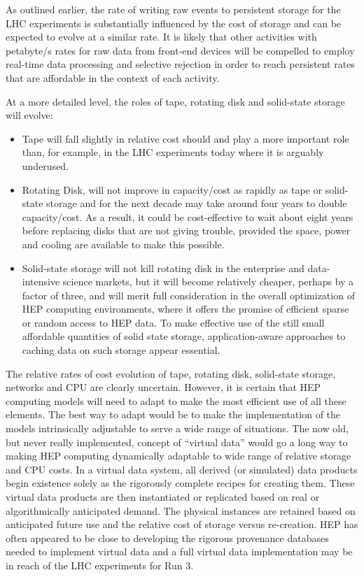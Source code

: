 As outlined earlier, the rate of writing raw events to persistent storage for the 
LHC experiments is substantially influenced by the cost of storage and can be 
expected to evolve at a similar rate.
It is likely that other activities with petabyte/s rates for raw data from 
front-end devices will be compelled to employ real-time data processing and 
selective rejection in order to reach persistent rates that are affordable 
in the context of each activity.

At a more detailed level, the roles of tape, rotating disk and solid-state 
storage will evolve:
\begin{itemize}
\item
Tape will fall slightly in relative cost should and play a more important role 
than, for example, in the LHC experiments today where it is arguably underused.
\item
Rotating Disk, will not improve in capacity/cost as rapidly as tape or solid-state 
storage and for the next decade may take around four years to double capacity/cost.  
As a result, it could be cost-effective to wait about eight years before replacing 
disks that are not giving trouble, provided the space, power and cooling are available to make this possible.
\item
Solid-state storage will not kill rotating disk in the enterprise and data-intensive 
science markets, but it will become relatively cheaper, perhaps by a factor of three, 
and will merit full consideration in the overall optimization of HEP computing 
environments, where it offers the promise of efficient sparse or random access 
to HEP data.  To make effective use of the still small affordable quantities of 
solid state storage, application-aware approaches to caching data on such storage 
appear essential.
\end{itemize}

The relative rates of cost evolution of tape, rotating disk, solid-state storage, 
networks and CPU are clearly uncertain.  However, it is certain that HEP computing
models will need to adapt to make the most efficient use of all these elements.  
The best way to adapt would be to make the implementation of the models 
intrinsically adjustable to serve a wide range of situations. The now old, 
but never really implemented, concept of ``virtual data'' would go a long way to 
making HEP computing dynamically adaptable to wide range of relative storage and 
CPU costs.  In a virtual data system, all derived (or simulated) data products 
begin existence solely as the rigorously complete recipes for creating them.  
These virtual data products are then instantiated or replicated based on real 
or algorithmically anticipated demand.  The physical instances are retained 
based on anticipated future use and the relative cost of storage versus re-creation.  
HEP has often appeared to be close to developing the rigorous provenance databases 
needed to implement virtual data and a full virtual data implementation may be in 
reach of the LHC experiments for Run 3. 

